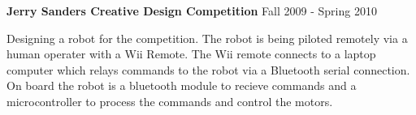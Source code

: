 
\textbf{Jerry Sanders Creative Design Competition} \hfill Fall 2009 - Spring 2010
\begin{description}
\item Designing a robot for the competition. The robot is being
piloted remotely via a human operater with a Wii Remote. The Wii remote
connects to a laptop computer which relays commands to the robot via
a Bluetooth serial connection. On board the robot is a bluetooth module
to recieve commands and a microcontroller to process the commands and
control the motors.
\end{description}

